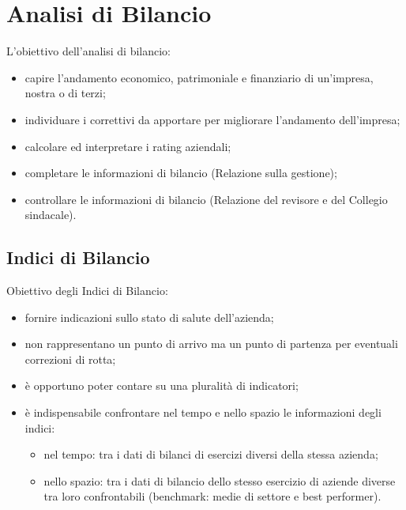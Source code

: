 \documentclass{article}
\begin{document}
\section{Analisi di Bilancio}
L'obiettivo dell'analisi di bilancio:
\begin{itemize}
    \item capire l'andamento economico, patrimoniale e finanziario di un'impresa, nostra o di terzi;
    \item individuare i correttivi da apportare per migliorare l'andamento dell'impresa;
    \item calcolare ed interpretare i rating aziendali;
    \item completare le informazioni di bilancio (Relazione sulla gestione);
    \item controllare le informazioni di bilancio (Relazione del revisore e del Collegio sindacale).
\end{itemize}



\subsection{Indici di Bilancio}
Obiettivo degli Indici di Bilancio:
\begin{itemize}
    \item fornire indicazioni sullo stato di salute dell'azienda;
    \item non rappresentano un punto di arrivo ma un punto di partenza per eventuali correzioni di rotta;
    \item è opportuno poter contare su una pluralità di indicatori;
    \item è indispensabile confrontare nel tempo e nello spazio le informazioni degli indici:
    \begin{itemize}
        \item nel tempo: tra i dati di bilanci di esercizi diversi della stessa azienda;
        \item nello spazio: tra i dati di bilancio dello stesso esercizio di aziende diverse tra loro
        confrontabili (benchmark: medie di settore e best performer).
    \end{itemize}
\end{itemize}
\end{document}

